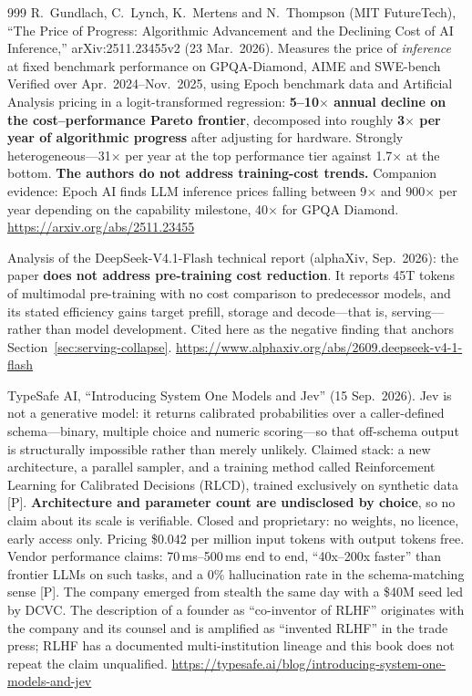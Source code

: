 \begin{thebibliography}{999}
 R.~Gundlach, C.~Lynch, K.~Mertens and N.~Thompson (MIT FutureTech), ``The Price of Progress: Algorithmic Advancement and the Declining Cost of AI Inference,'' arXiv:2511.23455v2 (23 Mar.\ 2026). Measures the price of \emph{inference} at fixed benchmark performance on GPQA-Diamond, AIME and SWE-bench Verified over Apr.\ 2024--Nov.\ 2025, using Epoch benchmark data and Artificial Analysis pricing in a logit-transformed regression: \textbf{5--10$\times$ annual decline on the cost--performance Pareto frontier}, decomposed into roughly \textbf{3$\times$ per year of algorithmic progress} after adjusting for hardware. Strongly heterogeneous---31$\times$ per year at the top performance tier against 1.7$\times$ at the bottom. \textbf{The authors do not address training-cost trends.} Companion evidence: Epoch AI finds LLM inference prices falling between 9$\times$ and 900$\times$ per year depending on the capability milestone, 40$\times$ for GPQA Diamond. \url{https://arxiv.org/abs/2511.23455}

 Analysis of the DeepSeek-V4.1-Flash technical report (alphaXiv, Sep.\ 2026): the paper \textbf{does not address pre-training cost reduction}. It reports 45T tokens of multimodal pre-training with no cost comparison to predecessor models, and its stated efficiency gains target prefill, storage and decode---that is, serving---rather than model development. Cited here as the negative finding that anchors Section~\ref{sec:serving-collapse}. \url{https://www.alphaxiv.org/abs/2609.deepseek-v4-1-flash}

 TypeSafe AI, ``Introducing System One Models and Jev'' (15 Sep.\ 2026). Jev is not a generative model: it returns calibrated probabilities over a caller-defined schema---binary, multiple choice and numeric scoring---so that off-schema output is structurally impossible rather than merely unlikely. Claimed stack: a new architecture, a parallel sampler, and a training method called Reinforcement Learning for Calibrated Decisions (RLCD), trained exclusively on synthetic data [P]. \textbf{Architecture and parameter count are undisclosed by choice}, so no claim about its scale is verifiable. Closed and proprietary: no weights, no licence, early access only. Pricing \$0.042 per million input tokens with output tokens free. Vendor performance claims: 70\,ms--500\,ms end to end, ``40x--200x faster'' than frontier LLMs on such tasks, and a 0\% hallucination rate in the schema-matching sense [P]. The company emerged from stealth the same day with a \$40M seed led by DCVC. The description of a founder as ``co-inventor of RLHF'' originates with the company and its counsel and is amplified as ``invented RLHF'' in the trade press; RLHF has a documented multi-institution lineage and this book does not repeat the claim unqualified. \url{https://typesafe.ai/blog/introducing-system-one-models-and-jev}


\end{thebibliography}
